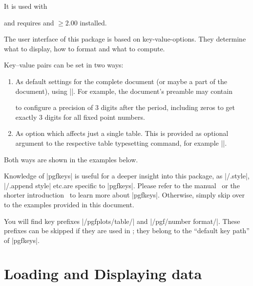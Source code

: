 It is used with
%
\begin{codeexample}
\usepackage{pgfplotstable}
\end{codeexample}
%
\noindent and requires \PGFPlots{} and \PGF{} $ \ge 2.00$ installed.

\begin{command}{\pgfplotstableset{}}
    The user interface of this package is based on key-value-options. They
    determine what to display, how to format and what to compute.

    Key--value pairs can be set in two ways:
    \begin{enumerate}
        \item As default settings for the complete document (or maybe a part
            of the document), using |\pgfplotstableset|. For
            example, the document's preamble may contain
\begin{codeexample}
\end{codeexample}
            to configure a precision of $3$ digits after the period, including
            zeros to get exactly $3$ digits for all fixed point numbers.
        \item As option which affects just a single table. This is provided
            as optional argument to the respective table typesetting command,
            for example |\pgfplotstabletypeset|.
    \end{enumerate}
    Both ways are shown in the examples below.

    Knowledge of |pgfkeys| is useful for a deeper insight into this package, as
    |/.style|, |/.append style| etc.\@ are specific to |pgfkeys|. Please refer
    to the \PGF{} manual~\cite[Section ``pgfkeys'']{tikz} or the shorter
    introduction~\cite{keyvalintro} to learn more about |pgfkeys|. Otherwise,
    simply skip over to the examples provided in this document.

    You will find key prefixes |/pgfplots/table/| and |/pgf/number format/|.
    These prefixes can be skipped if they are used in \PGFPlotstable{}; they
    belong to the ``default key path'' of |pgfkeys|.
\end{command}


\section[pgfplotstable-load-data]{Loading and Displaying data}

